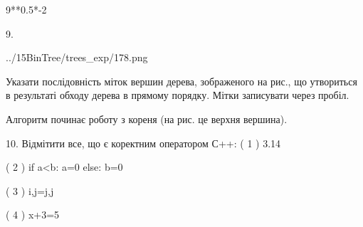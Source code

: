 \documentclass[11pt]{article}
\begin{document}
9**0.5*-2
\vspace{5mm}

9. 

\begin{center}
	{../15BinTree/trees_exp/178.png}
\end{center}
Указати послідовність міток вершин дерева, зображеного на рис., що утвориться в результаті обходу дерева в прямому порядку. Мітки записувати через пробіл.\par Алгоритм починає роботу з кореня (на рис. це верхня вершина).
\vspace{5mm}

10. %
Відмітити все, що є коректним оператором С++:
( 1 ) 3.14%

( 2 ) if a<b: a=0 else: b=0

( 3 ) i,j=j,j

( 4 ) x+3=5
\vspace{5mm}

\newpage
\end{document}
